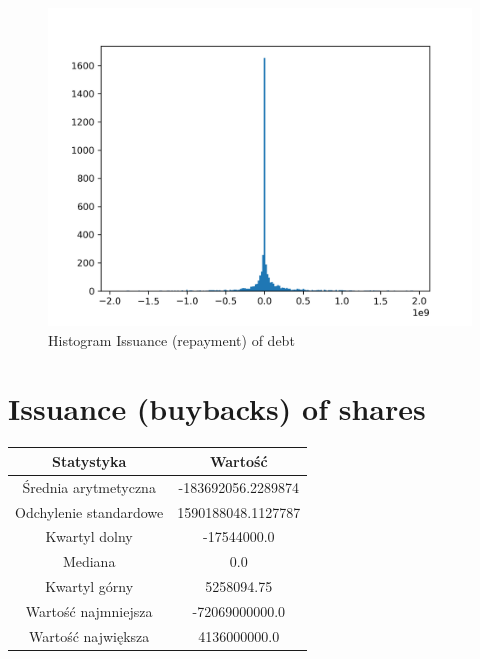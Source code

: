 \documentclass{article}
\begin{document}
\begin{figure}[h!]
    \includegraphics[width=\linewidth]{variables/Issuance (repayment) of debt.png}
    \caption{Histogram Issuance (repayment) of debt }
\end{figure}\section{ Issuance (buybacks) of shares }

\begin{center}
    \begin{tabular}{|c | c|} 
    \hline
    Statystyka & Wartość \\
    \hline\hline
    Średnia arytmetyczna & -183692056.2289874 \\ 
    \hline
    Odchylenie standardowe & 1590188048.1127787 \\
    \hline
    Kwartyl dolny & -17544000.0 \\
    \hline
    Mediana & 0.0 \\
    \hline
    Kwartyl górny & 5258094.75 \\
    \hline
    Wartość najmniejsza & -72069000000.0 \\
    \hline
    Wartość największa & 4136000000.0 \\
    \hline
   \end{tabular}
\end{center}
\end{document}

